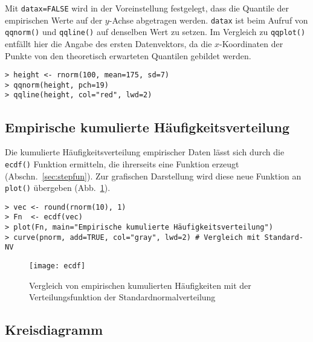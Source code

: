Mit \lstinline!datax=FALSE! wird in der Voreinstellung festgelegt, dass die Quantile der empirischen Werte auf der $y$-Achse abgetragen werden. \lstinline!datax! ist beim Aufruf von \lstinline!qqnorm()! und \lstinline!qqline()! auf denselben Wert zu setzen. Im Vergleich zu \lstinline!qqplot()! entfällt hier die Angabe des ersten Datenvektors, da die $x$-Koordinaten der Punkte von den theoretisch erwarteten Quantilen gebildet werden.
\begin{lstlisting}
> height <- rnorm(100, mean=175, sd=7)
> qqnorm(height, pch=19)
> qqline(height, col="red", lwd=2)
\end{lstlisting}

\subsection{Empirische kumulierte Häufigkeitsverteilung}
\label{sec:ecdfPlot}

Die kumulierte Häufigkeitsverteilung empirischer Daten lässt sich durch die \lstinline!ecdf()! Funktion ermitteln, die ihrerseits eine Funktion erzeugt (Abschn.\ \ref{sec:stepfun}). Zur grafischen Darstellung wird diese neue Funktion an \lstinline!plot()! übergeben (Abb.\ \ref{fig:ecdf}).
\begin{lstlisting}
> vec <- round(rnorm(10), 1)
> Fn  <- ecdf(vec)
> plot(Fn, main="Empirische kumulierte Häufigkeitsverteilung")
> curve(pnorm, add=TRUE, col="gray", lwd=2) # Vergleich mit Standard-NV
\end{lstlisting}

\begin{figure}[ht]
\centering
\texttt{[image: ecdf]}
\vspace*{-1em}
\caption{Vergleich von empirischen kumulierten Häufigkeiten mit der Verteilungsfunktion der Standardnormalverteilung}
\label{fig:ecdf}
\end{figure}

\subsection{Kreisdiagramm}

